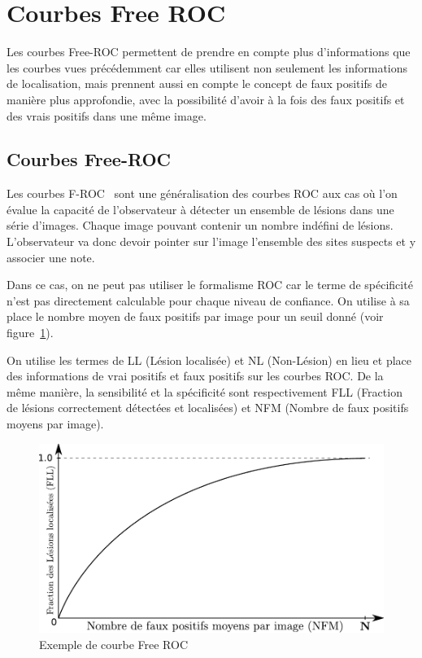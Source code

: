 \section{Courbes Free ROC}	

Les courbes Free-ROC permettent de prendre en compte plus d'informations que les courbes vues précédemment car elles utilisent non seulement les informations de localisation, mais prennent aussi en compte le concept de faux positifs de manière plus approfondie, avec la possibilité d'avoir à la fois des faux positifs et des vrais positifs dans une même image.

\subsection{Courbes Free-ROC}
\label{lab:FROC}

Les courbes F-ROC~\cite{bunch1978free} sont une généralisation des courbes ROC aux cas où l'on évalue la capacité de l'observateur à détecter un ensemble de lésions dans une série d'images. Chaque image pouvant contenir un nombre indéfini de lésions. L'observateur va donc devoir pointer sur l'image l'ensemble des sites suspects et y associer une note.

Dans ce cas, on ne peut pas utiliser le formalisme ROC car le terme de spécificité n'est pas directement calculable pour chaque niveau de confiance. On utilise à sa place le nombre moyen de faux positifs par image pour un seuil donné (voir figure~\ref{fig:courbeFROC}).

On utilise les termes de LL (Lésion localisée) et NL (Non-Lésion) en lieu et place des informations de vrai positifs et faux positifs sur les courbes ROC. De la même manière, la sensibilité et la spécificité sont respectivement FLL (Fraction de lésions correctement détectées et localisées) et NFM (Nombre de faux positifs moyens par image).


\begin{figure}[h]
	\begin{center}
	\includegraphics[width=15cm]{images/FROC}
	\end{center}
	\caption{Exemple de courbe Free ROC}
	\label{fig:courbeFROC}
\end{figure}

